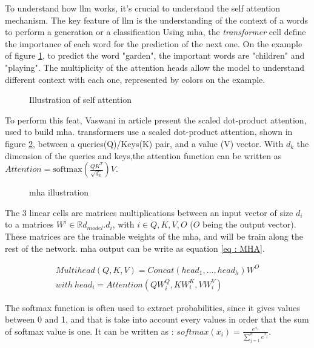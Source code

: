 To understand how \gls{llm} works, it's crucial to understand the self attention mechanism. The key feature of \gls{llm} is the understanding of the context of a words to perform a generation or a classification Using \gls{mha}, the \textit{\gls{transformer}} cell define the importance of each word for the prediction of the next one. On the example of figure \ref{fig:self_att}, to predict the word "garden", the important words are "children" and "playing". The multiplicity of the attention heads allow the model to understand different context with each one, represented by colors on the example. 

\begin{figure}[h]
    \centering
    
    \caption{Illustration of self attention}
    \label{fig:self_att}
\end{figure}


To perform this feat, Vaswani in article \cite{vaswani_attention_2017} present the scaled dot-product attention, used to build \gls{mha}. \Glspl{transformer} use a scaled dot-product attention, shown in figure \ref{fig:mha}, between a queries(Q)/Keys(K) pair, and a value (V) vector. With $d_k$ the dimension of the queries and keys,the attention function can be written as $Attention = \text{softmax} ( \frac{Q K^T}{\sqrt{d_k}})V$.

\begin{figure}[h]
    \centering
    
    \caption{\acrfull{mha} illustration }
    \label{fig:mha}
\end{figure}

The 3 linear cells are matrices multiplications between an input vector of size $d_i$ to a matrices $W^i \in \mathbb{R}{d_{model} . d_i}$, with $i \in {Q,K,V,O}$ ($O$ being the output vector). These matrices are the trainable weights of the \gls{mha}, and will be train along the rest of the network. \acrshort{mha} output can be write as equation \ref{eq : MHA}. 

\begin{equation}
\begin{split}
 Multihead (Q,K,V) = Concat (head_1,...,head_h)W^O\\
with \ head_i = Attention (Q W_i^Q,K W_i^K,V W_i^V)
\end{split}
\label{eq : MHA}  
\end{equation}

The softmax function is often used to extract probabilities, since it gives values between 0 and 1, and that is take into account every values in order that the sum of softmax value is one. It can be written as : $\displaystyle
softmax(x_i) = \frac{e^{x_i}}{\sum_{j=1}^n e^{x_j}}$.

